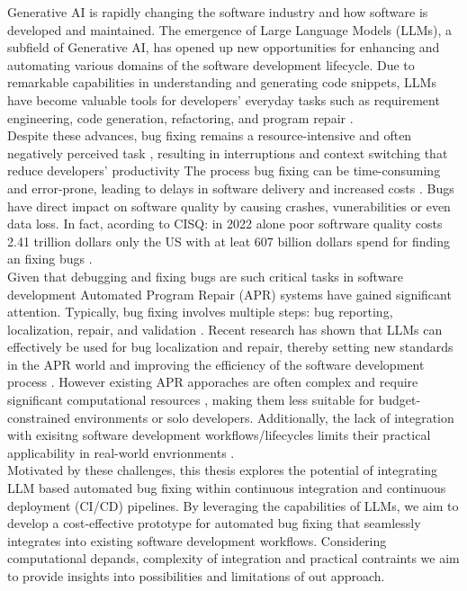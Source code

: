 Generative AI is rapidly changing the software industry and how software is developed and maintained. The emergence of Large Language Models (LLMs), a subfield of Generative AI, has opened up new opportunities for enhancing and automating various domains of the software development lifecycle. Due to remarkable capabilities in understanding and generating code snippets, LLMs have become valuable tools for developers' everyday tasks such as requirement engineering, code generation, refactoring, and program repair \cite{houLargeLanguageModels2024, puvvadiCodingAgentsComprehensive2025}.
\\
Despite these advances, bug fixing remains a resource-intensive and often negatively perceived task \cite{winterHowDevelopersReally2023}, resulting in  interruptions and context switching that reduce developers' productivity \cite{vasilescuSkyNotLimit2016}
The process bug fixing can be time-consuming and error-prone, leading to delays in software delivery and increased costs \cite{}. Bugs have direct impact on software quality by causing crashes, vunerabilities or even data loss. \cite{tihanyiNewEraSoftware2024}
In fact, acording to  CISQ: in 2022 alone poor softrware quality costs 2.41 trillion dollars only the US with at leat 607 billion dollars  spend for finding an fixing bugs \cite{CostPoorSoftware}.
\\
Given that debugging and fixing bugs are such critical tasks in software development Automated Program Repair (APR) systems have gained significant attention.
Typically, bug fixing involves multiple steps: bug reporting, localization, repair, and validation \cite{zhangEmpiricalStudyFactors2012, leeUnifiedDebuggingApproach2024,xiaAgentlessDemystifyingLLMbased2024,zhangPATCHEmpoweringLarge2025, wangEmpiricalResearchUtilizing2025}.
Recent research has shown that LLMs can effectively be used for bug localization and repair, thereby setting new standards in the APR world and improving the efficiency of the software development process \cite{xiaAgentlessDemystifyingLLMbased2024,liuMarsCodeAgentAInative2024,yangSWEagentAgentComputerInterfaces2024, sobaniaAnalysisAutomaticBug2023, xiaAutomatedProgramRepair2024, huCanGPTO1Kill2024}.
However existing APR apporaches are often complex and require significant computational resources \cite{rondonEvaluatingAgentbasedProgram2025, }, making them less suitable for budget-constrained environments or solo developers. Additionally, the lack of integration with exisitng software development workflows/lifecycles limits their practical applicability in real-world envrionments \cite{chenUnveilingPitfallsUnderstanding2025,liuMarsCodeAgentAInative2024}.
\\
Motivated by these challenges, this thesis explores the potential of integrating LLM based automated bug fixing within continuous integration and continuous deployment (CI/CD) pipelines. By leveraging the capabilities of LLMs, we aim to develop a cost-effective prototype for automated bug fixing that seamlessly integrates into existing software development workflows. Considering computational depands, complexity of integration and practical contraints we aim to provide insights into possibilities and limitations of out approach.




